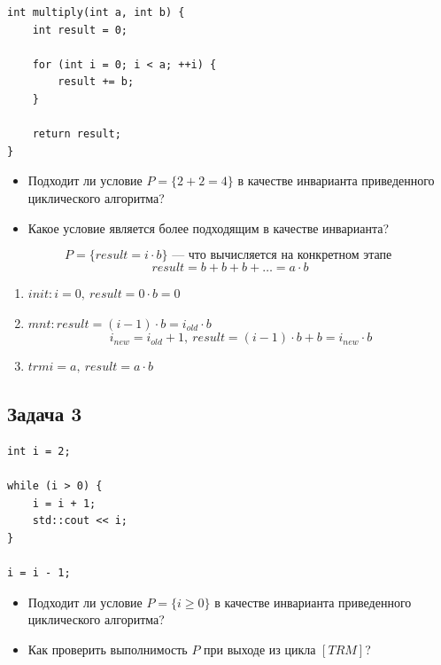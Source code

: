 \begin{exercise}

\begin{lstlisting}
int multiply(int a, int b) {
    int result = 0;

    for (int i = 0; i < a; ++i) {
        result += b;
    }

    return result;
}
\end{lstlisting}

\begin{itemize}
    \item Подходит ли условие $P = \{2 + 2 = 4\}$ в качестве инварианта приведенного циклического алгоритма?
    \item Какое условие является более подходящим в качестве инварианта?
\end{itemize}
    
\end{exercise}

\begin{solution}
    \[
        P = \{result = i \cdot b\} \text{ --- что вычисляется на конкретном этапе }
    \]
    \[
        result = b + b + b + \ldots = a \cdot b
    \]

    \begin{enumerate}
        \item[1)] $init : i = 0,\ result = 0 \cdot b = 0$
        \item[2)] $mnt : result = (i - 1) \cdot b = i_{old} \cdot b$
        \[
            i_{new} = i_{old} + 1,\ result = (i-1) \cdot b + b = i_{new} \cdot b  
        \]
        \item[3)] $trm i = a,\ result = a \cdot b$
    \end{enumerate}
\end{solution}

\subsection{Задача 3}

\begin{exercise}
\begin{lstlisting}
int i = 2;

while (i > 0) {
    i = i + 1;
    std::cout << i;
}

i = i - 1;
\end{lstlisting}

\begin{itemize}
    \item Подходит ли условие $P = \{i \geq 0\}$ в качестве инварианта приведенного циклического алгоритма?
    \item Как проверить выполнимость $P$ при выходе из цикла $[TRM]$?
\end{itemize}
\end{exercise}

